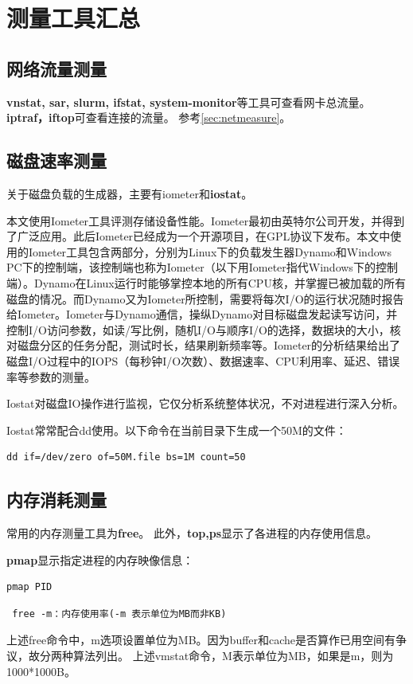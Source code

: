 \section{测量工具汇总}

\subsection{网络流量测量}
\textbf{vnstat, sar, slurm, ifstat, system-monitor}等工具可查看网卡总流量。\textbf{iptraf，iftop}可查看连接的流量。
参考\ref{sec:netmeasure}。


\subsection{磁盘速率测量}
关于磁盘负载的生成器，主要有iometer和\textbf{iostat}。

本文使用Iometer工具评测存储设备性能。Iometer最初由英特尔公司开发，并得到了广泛应用。此后Iometer已经成为一个开源项目，在GPL协议下发布。本文中使用的Iometer工具包含两部分，分别为Linux下的负载发生器Dynamo和Windows PC下的控制端，该控制端也称为Iometer（以下用Iometer指代Windows下的控制端）。Dynamo在Linux运行时能够掌控本地的所有CPU核，并掌握已被加载的所有磁盘的情况。而Dynamo又为Iometer所控制，需要将每次I/O的运行状况随时报告给Iometer。Iometer与Dynamo通信，操纵Dynamo对目标磁盘发起读写访问，并控制I/O访问参数，如读/写比例，随机I/O与顺序I/O的选择，数据块的大小，核对磁盘分区的任务分配，测试时长，结果刷新频率等。Iometer的分析结果给出了磁盘I/O过程中的IOPS（每秒钟I/O次数）、数据速率、CPU利用率、延迟、错误率等参数的测量。

Iostat对磁盘IO操作进行监视，它仅分析系统整体状况，不对进程进行深入分析。

Iostat常常配合dd使用。以下命令在当前目录下生成一个50M的文件：
\begin{verbatim}
dd if=/dev/zero of=50M.file bs=1M count=50
\end{verbatim}
 


\subsection{内存消耗测量}
常用的内存测量工具为\textbf{free}。
此外，\textbf{top,ps}显示了各进程的内存使用信息。

\textbf{pmap}显示指定进程的内存映像信息：
\begin{verbatim}
pmap PID
\end{verbatim}

\begin{verbatim}
 free -m：内存使用率(-m 表示单位为MB而非KB)
\end{verbatim}
上述free命令中，m选项设置单位为MB。因为buffer和cache是否算作已用空间有争议，故分两种算法列出。
上述vmstat命令，M表示单位为MB，如果是m，则为1000*1000B。


